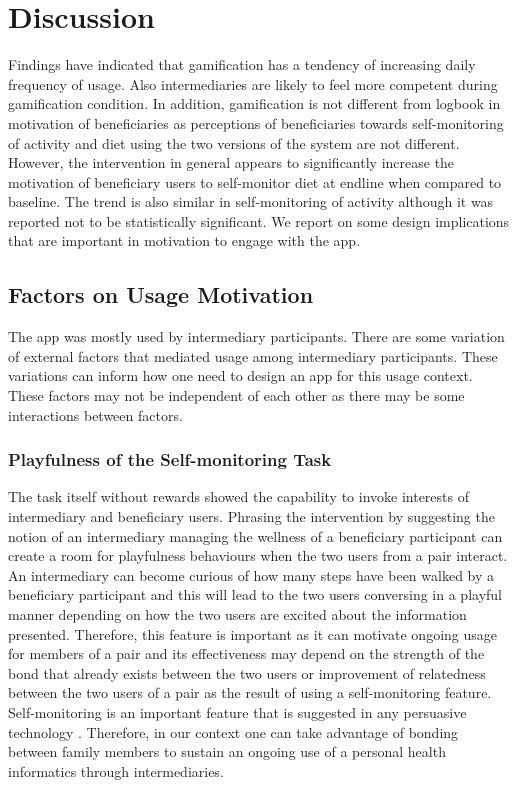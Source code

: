 \documentclass{sig-alternate}
\begin{document}
\section{Discussion}
Findings have indicated that gamification has a tendency of increasing daily frequency of usage. Also intermediaries are likely to feel more competent during gamification condition. In addition, gamification is not different from logbook in motivation of beneficiaries as perceptions of beneficiaries towards self-monitoring of activity and diet using the two versions of the system are not different. However, the intervention in general appears to significantly increase the motivation of beneficiary users to self-monitor diet at endline when compared to baseline. The trend is also similar in self-monitoring of activity although it was reported not to be statistically significant. We report on some design implications that are important in motivation to engage with the app.
\subsection{Factors on Usage Motivation}
The app was mostly used by intermediary participants. There are some variation of external factors that mediated usage among intermediary participants. These variations can inform how one need to design an app for this usage context. These factors may not be independent of each other as there may be some interactions between factors.
\subsubsection*{\textbf{Playfulness  of the Self-monitoring Task}} 
The task itself without rewards showed the capability to invoke interests of intermediary and beneficiary users. Phrasing the intervention by suggesting the notion of an intermediary managing the wellness of a beneficiary participant can create a room for playfulness behaviours when the two users from a pair interact. An intermediary can become curious of how many steps have been walked by a beneficiary participant and this will lead to the two users conversing in a playful manner depending on how the two users are excited about the information presented. Therefore, this feature is important as it can motivate ongoing usage for members of a pair and its effectiveness may depend on the strength of the bond that already exists between the two users or improvement of relatedness between the two users of a pair as the result of using a self-monitoring feature. Self-monitoring is an important feature that is suggested in any persuasive technology \cite{Oinas-kukkonen:psd}. Therefore, in our context one can take advantage of bonding between family members to sustain an ongoing use of a personal health informatics through intermediaries.  
\end{document}
